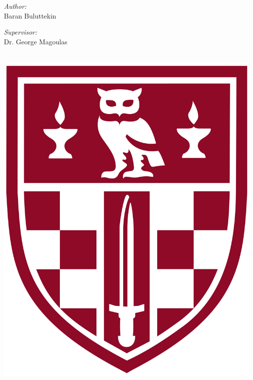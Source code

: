 \documentclass[12pt, twoside, a4paper]{article}
\begin{document}
\begin{titlepage}
\begin{center}
        \begin{minipage}[t]{0.4\textwidth}
        \begin{flushleft} \large
        \emph{Author:}\\
        {Baran Buluttekin} %
        \end{flushleft}
        \end{minipage}
        \begin{minipage}[t]{0.4\textwidth}
        \begin{flushright} \large
        \emph{Supervisor:} \\
        {Dr. George Magoulas} %
        \end{flushright}
        \end{minipage}\\
        [2cm] %
        \includegraphics[scale=0.05]{img/birkbeck-shield.png}
            \vfill


\end{center}
\end{titlepage}
\end{document}
